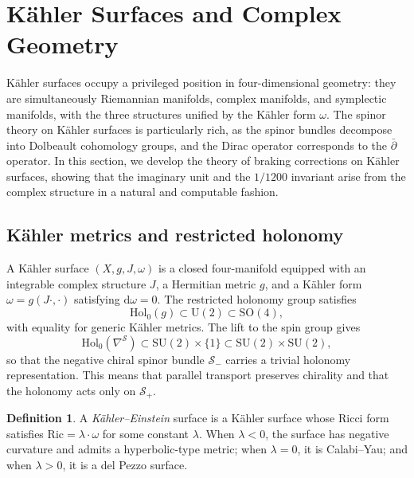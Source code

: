 \documentclass[12pt,a4paper]{article}
\theoremstyle{definition}
\newtheorem{definition}[theorem]{Definition}
\theoremstyle{remark}
\newcommand{\SO}{\mathrm{SO}}
\newcommand{\cS}{\mathcal{S}}
\newcommand{\dd}{\mathrm{d}}
\newcommand{\SU}{\mathrm{SU}}
\newcommand{\U}{\mathrm{U}}
\newcommand{\Ric}{\mathrm{Ric}}
\newcommand{\Hol}{\mathrm{Hol}}
\begin{document}
\section{K\"ahler Surfaces and Complex Geometry}
\label{sec: kahler}

K\"ahler surfaces occupy a privileged position in four-dimensional geometry: they are simultaneously Riemannian manifolds, complex manifolds, and symplectic manifolds, with the three structures unified by the K\"ahler form $\omega$. The spinor theory on K\"ahler surfaces is particularly rich, as the spinor bundles decompose into Dolbeault cohomology groups, and the Dirac operator corresponds to the $\bar\partial$ operator. In this section, we develop the theory of braking corrections on K\"ahler surfaces, showing that the imaginary unit and the $1/1200$ invariant arise from the complex structure in a natural and computable fashion.

\subsection{K\"ahler metrics and restricted holonomy}

A K\"ahler surface $(X, g, J, \omega)$ is a closed four-manifold equipped with an integrable complex structure $J$, a Hermitian metric $g$, and a K\"ahler form $\omega = g(J\cdot, \cdot)$ satisfying $\dd\omega = 0$. The restricted holonomy group satisfies
\begin{equation}
\Hol_0(g) \subset \U(2) \subset \SO(4),
\end{equation}
with equality for generic K\"ahler metrics. The lift to the spin group gives
\begin{equation}
\Hol_0(\nabla^{\cS}) \subset \SU(2) \times \{1\} \subset \SU(2) \times \SU(2),
\end{equation}
so that the negative chiral spinor bundle $\cS_-$ carries a trivial holonomy representation. This means that parallel transport preserves chirality and that the holonomy acts only on $\cS_+$.

\begin{definition}
A \emph{K\"ahler--Einstein} surface is a K\"ahler surface whose Ricci form satisfies $\Ric = \lambda \cdot \omega$ for some constant $\lambda$. When $\lambda < 0$, the surface has negative curvature and admits a hyperbolic-type metric; when $\lambda = 0$, it is Calabi--Yau; and when $\lambda > 0$, it is a del Pezzo surface.
\end{definition}
\end{document}
